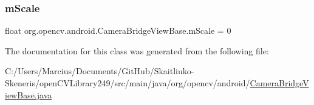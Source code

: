 \subsubsection{\texorpdfstring{m\+Scale}{mScale}}
{\footnotesize\ttfamily float org.\+opencv.\+android.\+Camera\+Bridge\+View\+Base.\+m\+Scale = 0\hspace{0.3cm}{\ttfamily [protected]}}



The documentation for this class was generated from the following file\+:\begin{DoxyCompactItemize}
\item 
C\+:/\+Users/\+Marcius/\+Documents/\+Git\+Hub/\+Skaitliuko-\/\+Skeneris/open\+C\+V\+Library249/src/main/java/org/opencv/android/\mbox{\hyperlink{_camera_bridge_view_base_8java}{Camera\+Bridge\+View\+Base.\+java}}\end{DoxyCompactItemize}
